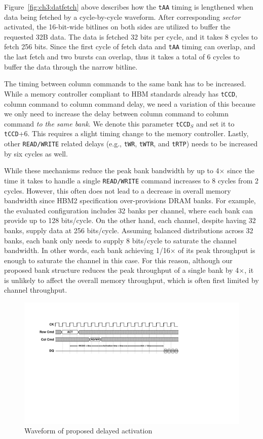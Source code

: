Figure~\ref{fig:ch3:datfetch} above describes how the {\tt tAA} timing is lengthened 
when data being fetched by a cycle-by-cycle waveform. After corresponding {\it sector} activated, 
the 16-bit-wide bitlines on both sides are utilized to buffer the requested 32B data. 
The data is fetched 32 bits per cycle, and it takes 8 cycles to fetch 256 bits.
Since the first cycle of fetch data and {\tt tAA} timing can overlap, and the last fetch and two bursts 
can overlap, thus it takes a total of 6 cycles to buffer the data through the narrow bitline.

The timing between column commands to the same bank has to be increased. While a memory controller compliant to HBM standards already has {\tt tCCD}, column command to column command delay, we need a variation of this because we only need to increase the delay between column command to column command {\it to the same bank}. We denote this parameter {\tt tCCD}$_S$ and set it to {\tt tCCD}+6. This requires a slight timing change to the memory controller. Lastly, other {\tt READ/WRITE} related delays (e.g., {\tt tWR}, {\tt tWTR}, and {\tt tRTP}) needs to be increased by six cycles as well.

While these mechanisms reduce the peak bank bandwidth by up to 4$\times$ since the time it takes to handle a single {\tt READ/WRITE} command increases to 8 cycles from 2 cycles. However, this often does not lead to a decrease in overall memory bandwidth since HBM2 specification over-provisions DRAM banks. For example, the evaluated configuration includes 32 banks per channel, where each bank can provide up to 128 bits/cycle. On the other hand, each channel, despite having 32 banks, supply data at 256 bits/cycle. Assuming balanced distributions across 32 banks, each bank only needs to supply 8 bits/cycle to saturate the channel bandwidth. In other words, each bank achieving 1/16$\times$ of its peak throughput is enough to saturate the channel in this case. For this reason, although our proposed bank structure reduces the peak throughput of a single bank by 4$\times$, it is unlikely to affect the overall memory throughput, which is often first limited by channel throughput.

\begin{figure}[b]
    \centering
        \includegraphics[width=\linewidth]{figure/waveform_del_act.pdf}
    \caption{Waveform of proposed delayed activation}
    \label{fig:ch3:delact}
\end{figure}

